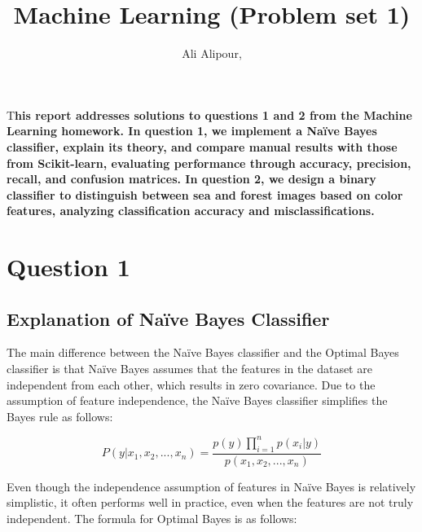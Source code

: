 \documentclass[DIV=calc, paper=a4, fontsize=11pt, twocolumn]{scrartcl}	 %
\title{Machine Learning (Problem set 1)} %
\author{Ali Alipour, } %
\date{} %
\newcommand{\initial}[1]{ %
\lettrine[lines=3,lhang=0.3,nindent=0em]{
\color{DarkGoldenrod}
{\textsf{#1}}}{}}
\begin{document}
\maketitle %

\thispagestyle{fancy} %


\initial{T}\textbf{his report addresses solutions to questions 1 and 2 from the Machine Learning homework. 
                   In question 1, we implement a Naïve Bayes classifier, explain its theory, and compare manual 
                   results with those from Scikit-learn, evaluating performance through accuracy, precision, 
                   recall, and confusion matrices. In question 2, we design a binary classifier to distinguish 
                   between sea and forest images based on color features, analyzing classification accuracy and misclassifications.}


\section*{\small{Question 1}}

\subsection*{\small{Explanation of Naïve Bayes Classifier}}
The main difference between the Naïve Bayes classifier and the Optimal Bayes classifier is that Naïve Bayes assumes that the features in the dataset are independent from each other, which results in zero covariance. Due to the assumption of feature independence, the Naïve Bayes classifier simplifies the Bayes rule as follows:

\[
P(y|x_1, x_2, ..., x_n) = \frac{p(y) \prod_{i=1}^{n} p(x_i | y)}{p(x_1, x_2, ..., x_n)}
\]

Even though the independence assumption of features in Naïve Bayes is relatively simplistic, it often performs well in practice, even when the features are not truly independent. The formula for Optimal Bayes is as follows:
\end{document}
